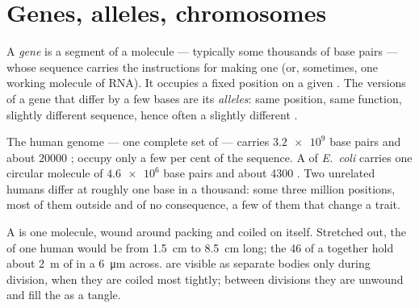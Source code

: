 \section{Genes, alleles, chromosomes}

\begin{definition}\label{def:g10:universal-dna:gene}
A \emph{gene} is a segment of a  molecule --- typically
some thousands of base pairs --- whose sequence carries the
instructions for making one  (or, sometimes, one working
molecule of RNA). It occupies a fixed position on a given .
The versions of a gene that differ by a few bases are its
\emph{alleles}: same position, same function, slightly
different sequence, hence often a slightly different .
\end{definition}

\begin{example}[Numbers]\label{ex:g10:universal-dna:numbers}
The human genome --- one complete set of  --- carries
$\num{3.2e9}$ base pairs and about $\num{20000}$ ;  occupy
only a few per cent of the sequence. A  of \emph{E.~coli} carries
one circular  molecule of $\num{4.6e6}$ base pairs and about 4300
. Two unrelated humans differ at roughly one base in a thousand:
some three million positions, most of them outside  and of no
consequence, a few of them  that change a trait.
\end{example}

\begin{proposition}[Chromosomes]\label{prop:g10:universal-dna:chromosome}
A  is one  molecule, wound around packing  and
coiled on itself. Stretched out, the  of one human  would
be from \qty{1.5}{cm} to \qty{8.5}{cm} long; the 46  of a
 together hold about \qty{2}{m} of  in a 
\qty{6}{\micro m} across.  are visible as separate bodies
only during  division, when they are coiled most tightly; between
divisions they are unwound and fill the  as a tangle.
\end{proposition}
\admitted


